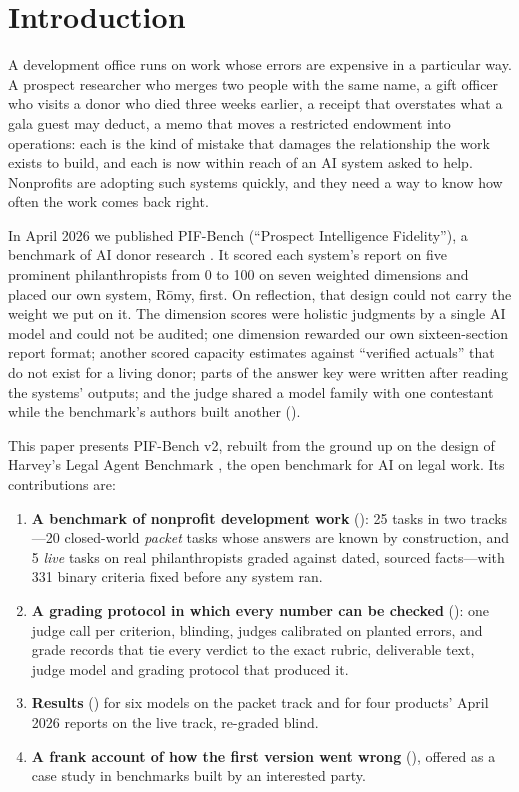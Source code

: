 \documentclass[11pt,a4paper]{article}
\newcommand{\romy}{R\={o}my}
\begin{document}
\section{Introduction}
\label{sec:introduction}

A development office runs on work whose errors are expensive in a particular way. A prospect researcher who merges two people with the same name, a gift officer who visits a donor who died three weeks earlier, a receipt that overstates what a gala guest may deduct, a memo that moves a restricted endowment into operations: each is the kind of mistake that damages the relationship the work exists to build, and each is now within reach of an AI system asked to help. Nonprofits are adopting such systems quickly, and they need a way to know how often the work comes back right.

In April 2026 we published PIF-Bench (``Prospect Intelligence Fidelity''), a benchmark of AI donor research \citep{lijo2026pifv1}. It scored each system's report on five prominent philanthropists from 0 to 100 on seven weighted dimensions and placed our own system, \romy, first. On reflection, that design could not carry the weight we put on it. The dimension scores were holistic judgments by a single AI model and could not be audited; one dimension rewarded our own sixteen-section report format; another scored capacity estimates against ``verified actuals'' that do not exist for a living donor; parts of the answer key were written after reading the systems' outputs; and the judge shared a model family with one contestant while the benchmark's authors built another ().

This paper presents PIF-Bench v2, rebuilt from the ground up on the design of Harvey's Legal Agent Benchmark \citep{harvey2026lab}, the open benchmark for AI on legal work. Its contributions are:

\begin{enumerate}[leftmargin=*]
  \item \textbf{A benchmark of nonprofit development work} (): 25 tasks in two tracks---20 closed-world \emph{packet} tasks whose answers are known by construction, and 5 \emph{live} tasks on real philanthropists graded against dated, sourced facts---with 331 binary criteria fixed before any system ran.
  \item \textbf{A grading protocol in which every number can be checked} (): one judge call per criterion, blinding, judges calibrated on planted errors, and grade records that tie every verdict to the exact rubric, deliverable text, judge model and grading protocol that produced it.
  \item \textbf{Results} () for six models on the packet track and for four products' April 2026 reports on the live track, re-graded blind.
  \item \textbf{A frank account of how the first version went wrong} (), offered as a case study in benchmarks built by an interested party.
\end{enumerate}
\end{document}
